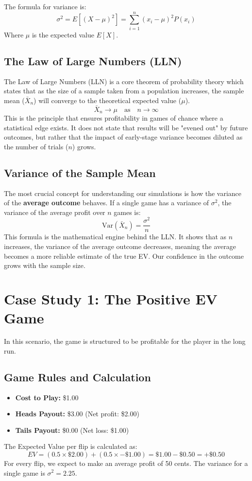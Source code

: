 \documentclass[12pt]{article}
\begin{document}
The formula for variance is:
\[
\sigma^2 = E[(X - \mu)^2] = \sum_{i=1}^{n} (x_i - \mu)^2 P(x_i)
\]
Where $\mu$ is the expected value $E[X]$.

\subsection{The Law of Large Numbers (LLN)}
The Law of Large Numbers (LLN) is a core theorem of probability theory which states that as the size of a sample taken from a population increases, the sample mean ($\bar{X}_n$) will converge to the theoretical expected value ($\mu$).
\[
\bar{X}_n \to \mu \quad \text{as} \quad n \to \infty
\]
This is the principle that ensures profitability in games of chance where a statistical edge exists. It does not state that results will be "evened out" by future outcomes, but rather that the impact of early-stage variance becomes diluted as the number of trials ($n$) grows.

\subsection{Variance of the Sample Mean}
The most crucial concept for understanding our simulations is how the variance of the \textbf{average outcome} behaves. If a single game has a variance of $\sigma^2$, the variance of the average profit over $n$ games is:
\[
\text{Var}(\bar{X}_n) = \frac{\sigma^2}{n}
\]
This formula is the mathematical engine behind the LLN. It shows that as $n$ increases, the variance of the average outcome decreases, meaning the average becomes a more reliable estimate of the true EV. Our confidence in the outcome grows with the sample size.

\section{Case Study 1: The Positive EV Game}
In this scenario, the game is structured to be profitable for the player in the long run.

\subsection{Game Rules and Calculation}
\begin{itemize}
    \item \textbf{Cost to Play:} \$1.00
    \item \textbf{Heads Payout:} \$3.00 (Net profit: \$2.00)
    \item \textbf{Tails Payout:} \$0.00 (Net loss: \$1.00)
\end{itemize}
The Expected Value per flip is calculated as:
\[
EV = (0.5 \times \$2.00) + (0.5 \times -\$1.00) = \$1.00 - \$0.50 = \boldsymbol{+\$0.50}
\]
For every flip, we expect to make an average profit of 50 cents. The variance for a single game is $\sigma^2 = 2.25$.
\end{document}
